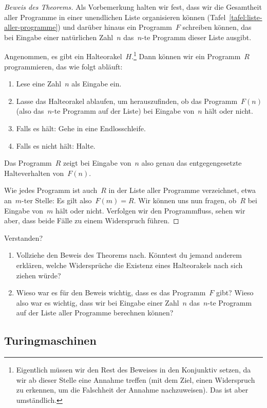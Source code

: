 \documentclass[twoside]{../zirkelblatt1415}
\theoremstyle{definition}
\theoremstyle{plain}
\theoremstyle{remark}
\newenvironment{listing}{
  \renewcommand*\theenumi{\arabic{enumi}}
  \renewcommand{\labelenumi}{\theenumi.}
  \begin{enumerate}\itemsep0em}{\end{enumerate}}
\begin{document}
\begin{proof}[Beweis des Theorems]
Als Vorbemerkung halten wir fest, dass wir
die Gesamtheit aller Programme in einer unendlichen Liste organisieren können
(Tafel~\ref{tafel:liste-aller-programme}) und darüber hinaus ein Programm~$F$
schreiben können, das bei Eingabe einer natürlichen Zahl~$n$ das~$n$-te
Programm dieser Liste ausgibt.

Angenommen, es gibt ein Halteorakel~$H$.\footnote{Eigentlich müssen wir den
Rest des Beweises in den Konjunktiv setzen, da wir ab dieser Stelle eine Annahme
treffen (mit dem Ziel, einen Widerspruch zu erkennen, um die Falschheit
der Annahme nachzuweisen). Das ist aber umständlich.}
Dann können wir ein Programm~$R$
programmieren, das wie folgt abläuft:
\begin{listing}
\item Lese eine Zahl~$n$ als Eingabe ein.
\item Lasse das Halteorakel ablaufen, um herauszufinden, ob das
Programm~$F(n)$ (also das~$n$-te Programm auf der Liste) bei Eingabe von~$n$
hält oder nicht.
\item Falls es hält: Gehe in eine Endlosschleife.
\item Falls es nicht hält: Halte.
\end{listing}
Das Programm~$R$ zeigt bei Eingabe von~$n$ also genau das entgegengesetzte
Halteverhalten von~$F(n)$.

Wie jedes Programm ist auch~$R$ in der Liste aller
Programme verzeichnet, etwa an~$m$-ter Stelle: Es gilt also~$F(m) = R$.
Wir können uns nun fragen, ob~$R$ bei Eingabe von~$m$ hält oder nicht. Verfolgen
wir den Programmfluss, sehen wir aber, dass beide Fälle zu einem Widerspruch
führen.
\end{proof}

\begin{aufgabe}{Verstanden?}
\begin{enumerate}
\item Vollziehe den Beweis des Theorems nach. Könntest du jemand anderem
erklären, welche Widersprüche die Existenz eines Halteorakels nach sich ziehen
würde?
\item Wieso war es für den Beweis wichtig, dass es das Programm~$F$ gibt? Wieso
also war es wichtig, dass wir bei Eingabe einer Zahl~$n$ das~$n$-te Programm
auf der Liste aller Programme berechnen können?
\end{enumerate}\fixlistspacing
\end{aufgabe}


\newpage
\subsection{Turingmaschinen}
\end{document}
